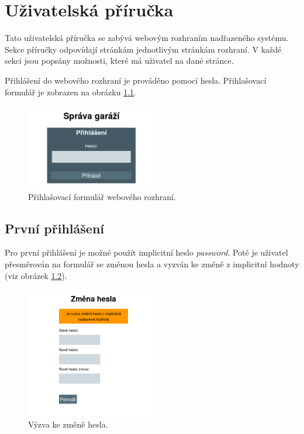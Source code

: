 \chapter{Uživatelská příručka}
\label{sec:guide}

Tato uživatelská příručka se zabývá webovým rozhraním nadřazeného systému. Sekce příručky odpovídají stránkám jednotlivým stránkám rozhraní. V každé sekci jsou popsány možnosti, které má uživatel na dané stránce.

Přihlášení do webového rozhraní je prováděno pomocí hesla. Přihlašovací formulář je zobrazen na obrázku \ref{fig:login}.

\begin{figure}[h!]
    \centering
    \includegraphics[width=0.5\textwidth]{images/login.png}
    \caption[Přihlašovací formulář webového rozhraní]{Přihlašovací formulář webového rozhraní.}
    \label{fig:login}
\end{figure}

\section{První přihlášení}

Pro první přihlášení je možné použít implicitní heslo \textit{password}. Poté je uživatel přesměrován na formulář se změnou hesla a vyzván ke změně z implicitní hodnoty (viz obrázek \ref{fig:password_change}).

\begin{figure}[h!]
    \centering
    \includegraphics[width=0.5\textwidth]{images/pwd_change.png}
    \caption[Výzva ke změně hesla]{Výzva ke změně hesla.}
    \label{fig:password_change}
\end{figure}


